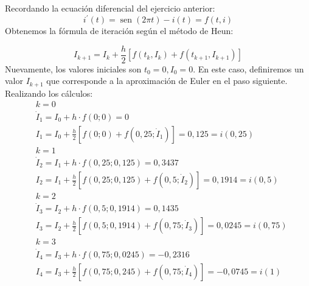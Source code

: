 \begin{questions}
    \question
    Recordando la ecuación diferencial del ejercicio anterior:
    \begin{equation*}
        i^{\prime}(t)=\operatorname{sen}(2 \pi t)-i(t)=f(t, i)
    \end{equation*}
    Obtenemos la fórmula de iteración según el método de Heun:

    \begin{equation*}
        I_{k+1}=I_k+\frac{h}{2}\left[f\left(t_k, I_k\right)+f\left(t_{k+1}, I_{k+1}\right)\right]
    \end{equation*}
    Nuevamente, los valores iniciales son $t_0=0, I_0=0$.
    En este caso, definiremos un valor $I_{k+1}^{\dot{~}}$ que corresponde a la
    aproximación de Euler en el paso siguiente.
    Realizando los cálculos:
    \begin{align*}
         & k=0                                                                                           \\
         & \dot{I}_1=I_0+h \cdot f(0 ; 0)=0                                                              \\
         & I_1=I_0+\frac{h}{2}\left[f(0 ; 0)+f\left(0,25 ; \dot{I}_1\right)\right]=0,125=i(0,25)         \\
         & k=1                                                                                           \\
         & \dot{I}_2=I_1+h \cdot f(0,25 ; 0,125)=0,3437                                                  \\
         & I_2=I_1+\frac{h}{2}\left[f(0,25 ; 0,125)+f\left(0,5 ; \dot{I}_2\right)\right]=0,1914=i(0,5)   \\
         & k=2                                                                                           \\
         & \dot{I}_3=I_2+h \cdot f(0,5 ; 0,1914)=0,1435                                                  \\
         & I_3=I_2+\frac{h}{2}\left[f(0,5 ; 0,1914)+f\left(0,75 ; \dot{I}_3\right)\right]=0,0245=i(0,75) \\
         & k=3                                                                                           \\
         & \dot{I}_4=I_3+h \cdot f(0,75 ; 0,0245)=-0,2316                                                \\
         & I_4=I_3+\frac{h}{2}\left[f(0,75 ; 0,245)+f\left(0,75 ; \dot{I}_4\right)\right]=-0,0745=i(1)
    \end{align*}


\end{questions}
